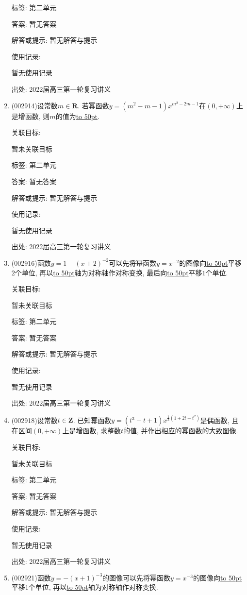 \documentclass[10pt,a4paper]{article}
\newcommand{\blank}[1]{\underline{\hbox to #1pt{}}}
\begin{document}
\begin{enumerate}[1.]
标签: 第二单元

答案: 暂无答案

解答或提示: 暂无解答与提示

使用记录:

暂无使用记录


出处: 2022届高三第一轮复习讲义
\item { (002914)}设常数$m\in \mathbf{R}$. 若幂函数$y=(m^2-m-1)x^{m^2-2m-1}$在$(0,+\infty)$上是增函数, 则$m$的值为\blank{50}.


关联目标:

暂未关联目标



标签: 第二单元

答案: 暂无答案

解答或提示: 暂无解答与提示

使用记录:

暂无使用记录


出处: 2022届高三第一轮复习讲义
\item { (002916)}函数$y=1-(x+2)^{-2}$可以先将幂函数$y=x^{-2}$的图像向\blank{50}平移$2$个单位, 再以\blank{50}轴为对称轴作对称变换, 最后向\blank{50}平移$1$个单位.


关联目标:

暂未关联目标



标签: 第二单元

答案: 暂无答案

解答或提示: 暂无解答与提示

使用记录:

暂无使用记录


出处: 2022届高三第一轮复习讲义
\item { (002918)}设常数$t\in \mathbf{Z}$. 已知幂函数$y=(t^3-t+1){x^{\frac 13(1+2t-t^2)}}$是偶函数, 且在区间$(0,+\infty)$上是增函数, 求整数$t$的值, 并作出相应的幂函数的大致图像.


关联目标:

暂未关联目标



标签: 第二单元

答案: 暂无答案

解答或提示: 暂无解答与提示

使用记录:

暂无使用记录


出处: 2022届高三第一轮复习讲义
\item { (002921)}函数$y=-(x+1)^{-3}$的图像可以先将幂函数$y=x^{-3}$的图像向\blank{50}平移1个单位, 再以\blank{50}轴为对称轴作对称变换.



\end{enumerate}
\end{document}
